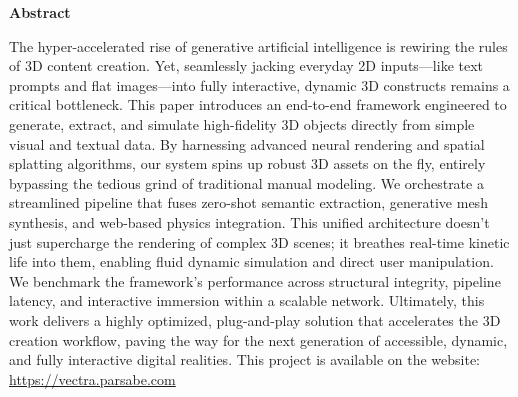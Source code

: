 \begin{center}
 \Large\textbf{Abstract}
\end{center}

\noindent The hyper-accelerated rise of generative artificial intelligence is rewiring the rules of 3D content creation. Yet, seamlessly jacking everyday 2D inputs---like text prompts and flat images---into fully interactive, dynamic 3D constructs remains a critical bottleneck. This paper introduces an end-to-end framework engineered to generate, extract, and simulate high-fidelity 3D objects directly from simple visual and textual data. By harnessing advanced neural rendering and spatial splatting algorithms, our system spins up robust 3D assets on the fly, entirely bypassing the tedious grind of traditional manual modeling. We orchestrate a streamlined pipeline that fuses zero-shot semantic extraction, generative mesh synthesis, and web-based physics integration. This unified architecture doesn't just supercharge the rendering of complex 3D scenes; it breathes real-time kinetic life into them, enabling fluid dynamic simulation and direct user manipulation. We benchmark the framework’s performance across structural integrity, pipeline latency, and interactive immersion within a scalable network. Ultimately, this work delivers a highly optimized, plug-and-play solution that accelerates the 3D creation workflow, paving the way for the next generation of accessible, dynamic, and fully interactive digital realities. This project is available on the website: \url{https://vectra.parsabe.com}